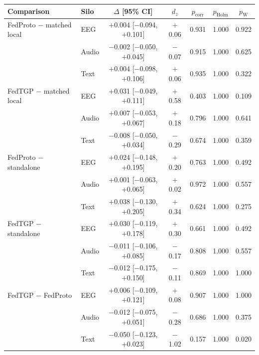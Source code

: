 \begin{tabular}{llccccc}
\toprule
\textbf{Comparison} & \textbf{Silo} & \textbf{$\Delta$ [95\% CI]} & \textbf{$d_z$} & \textbf{$p_{\mathrm{corr}}$} & \textbf{$p_{\mathrm{Holm}}$} & \textbf{$p_{\mathrm{W}}$} \\
\midrule
FedProto $-$ matched local & EEG & $+$0.004 [$-$0.094, $+$0.101] & $+$0.06 & 0.931 & 1.000 & 0.922 \\
 & Audio & $-$0.002 [$-$0.050, $+$0.045] & $-$0.07 & 0.915 & 1.000 & 0.625 \\
 & Text & $+$0.004 [$-$0.098, $+$0.106] & $+$0.06 & 0.935 & 1.000 & 0.322 \\
\midrule
FedTGP $-$ matched local & EEG & $+$0.031 [$-$0.049, $+$0.111] & $+$0.58 & 0.403 & 1.000 & 0.109 \\
 & Audio & $+$0.007 [$-$0.053, $+$0.067] & $+$0.18 & 0.796 & 1.000 & 0.641 \\
 & Text & $-$0.008 [$-$0.050, $+$0.034] & $-$0.29 & 0.674 & 1.000 & 0.359 \\
\midrule
FedProto $-$ standalone & EEG & $+$0.024 [$-$0.148, $+$0.195] & $+$0.20 & 0.763 & 1.000 & 0.492 \\
 & Audio & $+$0.001 [$-$0.063, $+$0.065] & $+$0.02 & 0.972 & 1.000 & 0.557 \\
 & Text & $+$0.038 [$-$0.130, $+$0.205] & $+$0.34 & 0.624 & 1.000 & 0.275 \\
\midrule
FedTGP $-$ standalone & EEG & $+$0.030 [$-$0.119, $+$0.178] & $+$0.30 & 0.661 & 1.000 & 0.492 \\
 & Audio & $-$0.011 [$-$0.106, $+$0.085] & $-$0.17 & 0.808 & 1.000 & 0.557 \\
 & Text & $-$0.012 [$-$0.175, $+$0.150] & $-$0.11 & 0.869 & 1.000 & 1.000 \\
\midrule
FedTGP $-$ FedProto & EEG & $+$0.006 [$-$0.109, $+$0.121] & $+$0.08 & 0.907 & 1.000 & 1.000 \\
 & Audio & $-$0.012 [$-$0.075, $+$0.051] & $-$0.28 & 0.686 & 1.000 & 0.375 \\
 & Text & $-$0.050 [$-$0.123, $+$0.023] & $-$1.02 & 0.157 & 1.000 & 0.020 \\
\bottomrule
\end{tabular}